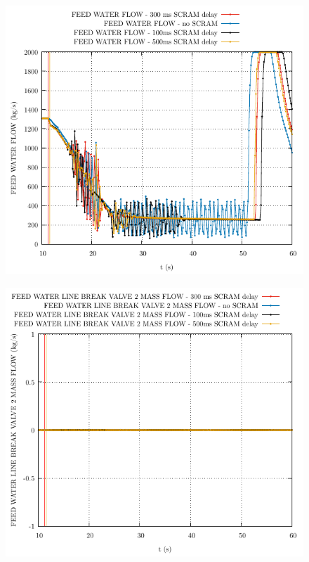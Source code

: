 \documentclass{article}
\begin{document}
\begin{multicols}{2}
\begin{figure}[H]
\end{figure}
\begin{figure}[H]
\centering
\includegraphics[width=\columnwidth]{./graphs/FEED WATER FLOW_comp.pdf}
\end{figure}
\begin{figure}[H]
\centering
\includegraphics[width=\columnwidth]{./graphs/FEED WATER LINE BREAK VALVE 2 MASS FLOW_comp.pdf}

\end{figure}
\end{multicols}
\end{document}
